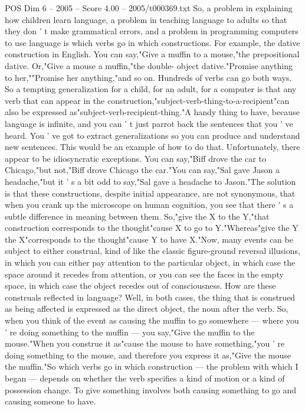 \begin{textsample}{POS Dim 6 – 2005 – Score 4.00 – 2005/t000369.txt}
So, a problem in explaining how children learn language, a problem in teaching language to adults so that they don ' t make grammatical errors, and a problem in programming computers to use language is which verbs go in which constructions.
For example, the dative construction in English.
You can say,"Give a muffin to a mouse,"the prepositional dative.
Or,"Give a mouse a muffin,"the double- object dative."Promise anything to her,""Promise her anything,"and so on.
Hundreds of verbs can go both ways.
So a tempting generalization for a child, for an adult, for a computer is that any verb that can appear in the construction,"subject-verb-thing-to-a-recipient"can also be expressed as"subject-verb-recipient-thing."A handy thing to have, because language is infinite, and you can ' t just parrot back the sentences that you ' ve heard.
You ' ve got to extract generalizations so you can produce and understand new sentences.
This would be an example of how to do that.
Unfortunately, there appear to be idiosyncratic exceptions.
You can say,"Biff drove the car to Chicago,"but not,"Biff drove Chicago the car."You can say,"Sal gave Jason a headache,"but it ' s a bit odd to say,"Sal gave a headache to Jason."The solution is that these constructions, despite initial appearance, are not synonymous, that when you crank up the microscope on human cognition, you see that there ' s a subtle difference in meaning between them.
So,"give the X to the Y,"that construction corresponds to the thought"cause X to go to Y."Whereas"give the Y the X"corresponds to the thought"cause Y to have X."Now, many events can be subject to either construal, kind of like the classic figure-ground reversal illusions, in which you can either pay attention to the particular object, in which case the space around it recedes from attention, or you can see the faces in the empty space, in which case the object recedes out of consciousness.
How are these construals reflected in language?
Well, in both cases, the thing that is construed as being affected is expressed as the direct object, the noun after the verb.
So, when you think of the event as causing the muffin to go somewhere — where you ' re doing something to the muffin — you say,"Give the muffin to the mouse."When you construe it as"cause the mouse to have something,"you ' re doing something to the mouse, and therefore you express it as,"Give the mouse the muffin."So which verbs go in which construction — the problem with which I began — depends on whether the verb specifies a kind of motion or a kind of possession change.
To give something involves both causing something to go and causing someone to have.

\end{textsample}
